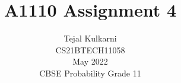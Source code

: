 \documentclass[journal,12pt,two column]{IEEEtran}
\title{A1110 Assignment 4 }
\author{Tejal Kulkarni \\ CS21BTECH11058 \\\vspace*{20pt} May 2022 \\ CBSE Probability Grade 11 }
\begin{document}
\newcommand{\solution}{\noindent \textbf{Solution: }}
\providecommand{\pr}[1]{\ensuremath{\Pr\left(#1\right)}}
\providecommand{\qfunc}[1]{\ensuremath{Q\left(#1\right)}}
\providecommand{\sbrak}[1]{\ensuremath{{}\left[#1\right]}}
\providecommand{\lsbrak}[1]{\ensuremath{{}\left[#1\right.}}
\providecommand{\rsbrak}[1]{\ensuremath{{}\left.#1\right]}}
\providecommand{\brak}[1]{\ensuremath{\left(#1\right)}}
\providecommand{\lbrak}[1]{\ensuremath{\left(#1\right.}}
\providecommand{\rbrak}[1]{\ensuremath{\left.#1\right)}}
\providecommand{\cbrak}[1]{\ensuremath{\left\{#1\right\}}}
\providecommand{\lcbrak}[1]{\ensuremath{\left\{#1\right.}}
\providecommand{\rcbrak}[1]{\ensuremath{\left.#1\right\}}}
\newcommand*{\permcomb}[4][0mu]{{{}^{#3}\mkern#1#2_{#4}}}
\newcommand*{\perm}[1][-3mu]{\permcomb[#1]{P}}
\newcommand*{\comb}[1][-1mu]{\permcomb[#1]{C}}
\renewcommand{\thetable}{\arabic{table}} 

\maketitle
\end{document}
